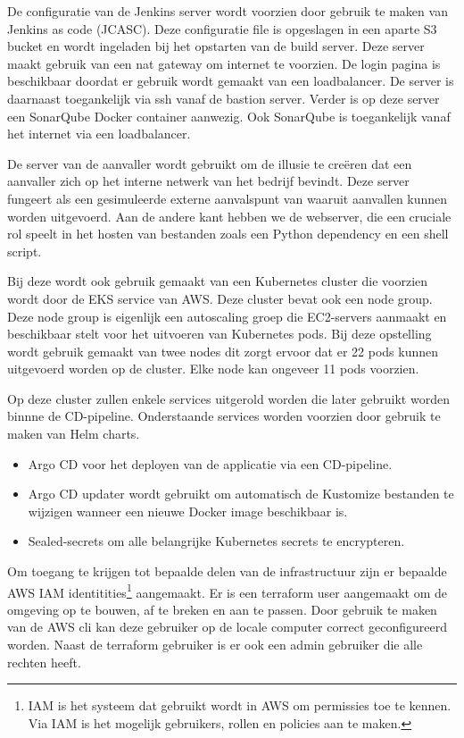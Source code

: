 De configuratie van de Jenkins server wordt voorzien door gebruik te maken van Jenkins as code (JCASC). Deze configuratie file is opgeslagen in een aparte S3 bucket en wordt ingeladen bij het opstarten van de build server. Deze server maakt gebruik van een nat gateway om internet te voorzien. De login pagina is beschikbaar doordat er gebruik wordt gemaakt van een loadbalancer. De server is daarnaast toegankelijk via ssh vanaf de bastion server. Verder is op deze server een SonarQube Docker container aanwezig. Ook SonarQube is toegankelijk vanaf het internet via een loadbalancer.
\newline

De server van de aanvaller wordt gebruikt om de illusie te creëren dat een aanvaller zich op het interne netwerk van het bedrijf bevindt. Deze server fungeert als een gesimuleerde externe aanvalspunt van waaruit aanvallen kunnen worden uitgevoerd. Aan de andere kant hebben we de webserver, die een cruciale rol speelt in het hosten van bestanden zoals een Python dependency en een shell script.
\newline

Bij deze  wordt ook gebruik gemaakt van een Kubernetes cluster die voorzien wordt door de EKS service van AWS. Deze cluster bevat ook een node group. Deze node group is eigenlijk een autoscaling groep die EC2-servers aanmaakt en beschikbaar stelt voor het uitvoeren van Kubernetes pods. Bij deze opstelling wordt gebruik gemaakt van twee nodes dit zorgt ervoor dat er 22 pods kunnen uitgevoerd worden op de cluster. Elke node kan ongeveer 11 pods voorzien. 
\clearpage

Op deze cluster zullen enkele services uitgerold worden die later gebruikt worden binnne de CD-pipeline. Onderstaande services worden voorzien door gebruik te maken van Helm charts.

\begin{itemize}
  \item Argo CD voor het deployen van de applicatie via een CD-pipeline.
  \item Argo CD updater wordt gebruikt om automatisch de Kustomize bestanden te wijzigen wanneer een nieuwe Docker image beschikbaar is.
  \item Sealed-secrets om alle belangrijke Kubernetes secrets te encrypteren.
\end{itemize}

Om toegang te krijgen tot bepaalde delen van de infrastructuur zijn er bepaalde AWS IAM identitities\footnote{IAM is het systeem dat gebruikt wordt in AWS om permissies toe te kennen. Via IAM is het mogelijk gebruikers, rollen en policies aan te maken.} aangemaakt. Er is een terraform user aangemaakt om de omgeving op te bouwen, af te breken en aan te passen. Door gebruik te maken van de AWS cli kan deze gebruiker op de locale computer correct geconfigureerd worden. Naast de terraform gebruiker is er ook een admin gebruiker die alle rechten heeft.
\newline 

